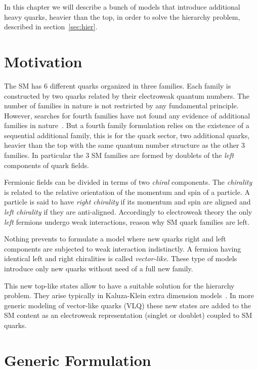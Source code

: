 In this chapter we will describe a bunch of models that introduce additional heavy quarks, heavier than the top, in order to solve the hierarchy problem, described in section~\ref{sec:hier}. 

\section{Motivation}
\label{sec:motiv}

The SM has 6 different quarks organized in three families. Each family is constructed by two quarks related by their electroweak quantum numbers. The number of families in nature is not restricted by any fundamental principle. However, searches for fourth families have not found any evidence of additional families in nature~\cite{Eberhardt:2012gv}. But a fourth family formulation relies on the existence of a sequential additional family, this is for the quark sector, two additional quarks, heavier than the top with the same quantum number structure as the other 3 families. In particular the 3 SM families are formed by doublets of the \textit{left} components of quark fields. 

Fermionic fields can be divided in terms of two \textit{chiral} components. The \textit{chirality} is related to the relative orientation of the momentum and spin of a particle. A particle is said to have \textit{right chirality} if its momentum and spin are aligned and \textit{left chirality} if they are anti-aligned.  Accordingly to electroweak theory the only \textit{left} fermions undergo weak interactions, reason why SM quark families are left. 

Nothing prevents to formulate a model where new quarks right and left components are subjected to weak interaction indistinctly. A fermion having identical left and right chiralities is called \textit{vector-like}. These type of models introduce only new quarks without need of a full new family.

This new top-like states allow to have a suitable solution for the hierarchy problem. They arise typically in Kaluza-Klein extra dimension models~\cite{Contino:2006qr, Matsedonskyi:2012ym, Dissertori:2010ug}. In more generic modeling of vector-like quarks (VLQ) these new states are added to the SM content as an electroweak representation (singlet or doublet) coupled to SM quarks.

\section{Generic Formulation}
\label{sec:form}

